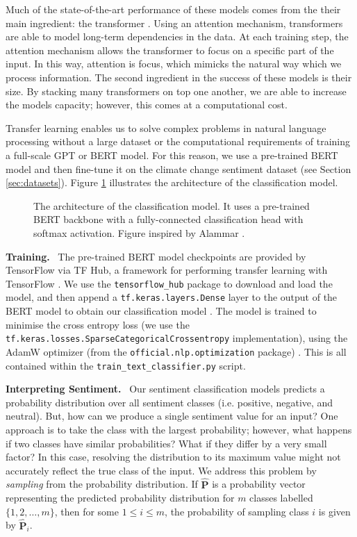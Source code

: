 \documentclass{paper}
\let\vec\mathbf
\newcommand{\inlineSection}[1]{\vspace{0.5em}\noindent\textbf{#1.}~}
\begin{document}
Much of the state-of-the-art performance of these models comes from the their main ingredient: the transformer \cite{vaswani2017attention}. Using an attention mechanism, transformers are able to model long-term dependencies in the data. At each training step, the attention mechanism allows the transformer to focus on a specific part of the input. In this way, attention is focus, which mimicks the natural way which we process information. The second ingredient in the success of these models is their size. By stacking many transformers on top one another, we are able to increase the models capacity; however, this comes at a computational cost.

Transfer learning enables us to solve complex problems in natural language processing without a large dataset or the computational requirements of training a full-scale GPT or BERT model. For this reason, we use a pre-trained BERT model and then fine-tune it on the climate change sentiment dataset (see Section \ref{sec:datasets}). Figure \ref{fig:bert_architecture} illustrates the architecture of the classification model.

\begin{figure}[ht]
    \centering
    
    \caption{The architecture of the classification model. It uses a pre-trained BERT backbone with a fully-connected classification head with softmax activation. Figure inspired by Alammar \cite{illustrated_bert}.}
    \label{fig:bert_architecture}
\end{figure}

\inlineSection{Training} The pre-trained BERT model checkpoints are provided by TensorFlow via TF Hub, a framework for performing transfer learning with TensorFlow \cite{tf_hubs}. We use the \texttt{tensorflow\_hub} package to download and load the model, and then append a \texttt{tf.keras.layers.Dense} layer to the output of the BERT model to obtain our classification model \cite{tf_keras_docs, tf_hubs_github}. The model is trained to minimise the cross entropy loss (we use the \texttt{tf.keras.losses.SparseCategoricalCrossentropy} implementation), using the AdamW optimizer (from the \texttt{official.nlp.optimization} package) \cite{tf_officials_github}. This is all contained within the \texttt{train\_text\_classifier.py} script.

\inlineSection{Interpreting Sentiment} Our sentiment classification models predicts a probability distribution over all sentiment classes (i.e. positive, negative, and neutral). But, how can we produce a single sentiment value for an input? One approach is to take the class with the largest probability; however, what happens if two classes have similar probabilities? What if they differ by a very small factor? In this case, resolving the distribution to its maximum value might not accurately reflect the true class of the input. We address this problem by \textit{sampling} from the probability distribution. If $\hat{\vec{P}}$ is a probability vector representing the predicted probability distribution for $m$ classes labelled $\{1,2,\ldots,m\}$, then for some $1\leq i \leq m$, the probability of sampling class $i$ is given by $\hat{\vec{P}}_i$.
\end{document}
